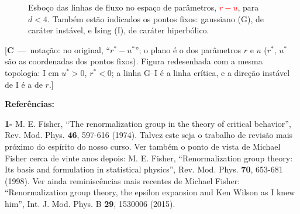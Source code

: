 \documentclass[12pt,a4paper]{article}
\newcounter{corr}
\newcommand{\nota}[2]{\refstepcounter{corr}\label{#1}%
  {\color{red}\small[\textbf{C\thecorr}~---~#2]}}
\begin{document}
\begin{figure}[H]
\centering
{}
\caption{Esboço das linhas de fluxo no espaço de parâmetros, \textcolor{red}{$r-u$}, para
$d<4$. Também estão indicados os pontos fixos: gaussiano (G), de caráter
instável, e Ising (I), de caráter hiperbólico.}
\end{figure}
\noindent\nota{c:fig4cap}{notação: no original, ``$r^*-u^*$''; o plano é o dos parâmetros $r$ e $u$
($r^*$, $u^*$ são as coordenadas dos pontos fixos). Figura redesenhada com a mesma topologia:
I em $u^*>0$, $r^*<0$; a linha G--I é a linha crítica, e a direção instável de I é a de $r$.}



\textbf{Referências:}

\textbf{1-} M. E. Fisher, ``The renormalization group in the theory of critical
behavior'', Rev. Mod. Phys. \textbf{46}, 597-616 (1974). Talvez este seja o trabalho
de revisão mais próximo do espírito do nosso curso. Ver também o ponto de
vista de Michael Fisher cerca de vinte anos depois: M. E. Fisher,
``Renormalization group theory: Its basis and formulation in statistical physics'', Rev.
Mod. Phys. \textbf{70}, 653-681 (1998). Ver ainda reminiscências mais recentes de
Michael Fisher: ``Renormalization group theory, the epsilon expansion and
Ken Wilson as I knew him'', Int. J. Mod. Phys. B \textbf{29}, 1530006 (2015).
\end{document}
